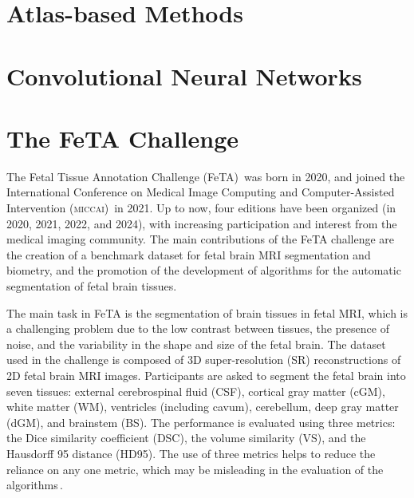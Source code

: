 \section{Atlas-based Methods}

\section{Convolutional Neural Networks}

\section{The FeTA Challenge}
The Fetal Tissue Annotation Challenge (FeTA)\,\cite{FeTA2024} was born in 2020, and joined the International Conference on Medical Image Computing and Computer-Assisted Intervention (\textsc{miccai})\,\cite{MICCAI} in 2021. Up to now, four editions have been organized (in 2020, 2021, 2022, and 2024), with increasing participation and interest from the medical imaging community. The main contributions of the FeTA challenge are the creation of a benchmark dataset for fetal brain MRI segmentation and biometry, and the promotion of the development of algorithms for the automatic segmentation of fetal brain tissues.

The main task in FeTA is the segmentation of brain tissues in fetal MRI, which is a challenging problem due to the low contrast between tissues, the presence of noise, and the variability in the shape and size of the fetal brain. The dataset used in the challenge is composed of 3D super-resolution (SR) reconstructions of 2D fetal brain MRI images. Participants are asked to segment the fetal brain into seven tissues: external cerebrospinal fluid (CSF), cortical gray matter (cGM), white matter (WM), ventricles (including cavum), cerebellum, deep gray matter (dGM), and brainstem (BS). The performance is evaluated using three metrics: the Dice similarity coefficient (DSC), the volume similarity (VS), and the Hausdorff 95 distance (HD95). The use of three metrics helps to reduce the reliance on any one metric, which may be misleading in the evaluation of the algorithms\,\cite{FeTA2024_paper}.

